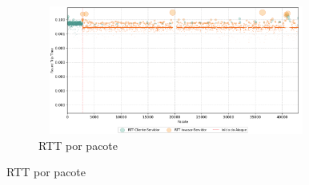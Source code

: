 \begin{apendicesenv}
\begin{figure}[htbp!]
\begin{subfigure}[t]{0.5\textwidth}
        \centering
        \caption{RTT por pacote}
        \includegraphics[width=1\textwidth, height=120pt]{USPSC-img/output/cropped/1-dos_function_call_null_deref-rttp.png}
    \end{subfigure}%
\end{figure}


\end{apendicesenv}
